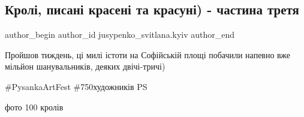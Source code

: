 
 
 
 
 
 
\subsection{Кролі, писані красені та красуні) - частина третя}
\label{sec:11_04_2018.fb.jusypenko_svitlana.kyiv.1.kroli_kraseni_krasuni_3}
 
\ifcmt
 author_begin
   author_id jusypenko_svitlana.kyiv
 author_end
\fi

Пройшов тиждень, ці милі істоти на Софійській площі побачили напевно вже
мільйон шанувальників, деяких двічі-тричі) 

\#PysankaArtFest \#750художників PS

фото 100 кролів
